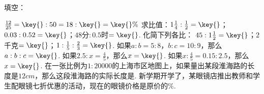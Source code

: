 填空：

\begin{subquestions}
\subquestion $\frac{12}{25}=\key{}:50=18:\key{}=\key{}\%$
\subquestion 求比值：$1\frac{1}{4}:\frac{1}{2}=\key{}$；$0.03:0.52=\key{}$；$48$分$:0.5$时$=\key{}$.
\subquestion 化简下列各比：
$45:1\frac{1}{2}=\key{}$；$2$千克$=\key{}$；$1:\frac{1}{5}:\frac{2}{3}=\key{}$.
\subquestion 如果$a:b=5:8$，$b:c=10:9$，那么$a:b:c=\key{}$.
\subquestion 如果$2.5:x=\frac{4}{5}$，那么$x=\key{}$.
\subquestion 如果$x:\frac{4}{5}=0.15:2.5$，那么$x=\key{}$.
\subquestion 在一张比例为$1:20000$的上海市区地图上，如果量出某段淮海路的长度是$12cm$，那么这段淮海路的实际长度是\key{}.
\subquestion 新学期开学了，某眼镜店推出教师和学生配眼镜七折优惠的活动，现在的眼镜价格是原价的\key{}$\%$.

\end{subquestions}